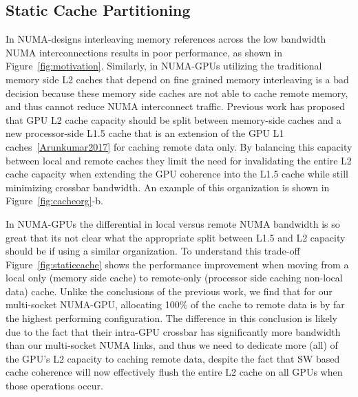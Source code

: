 \subsection{Static Cache Partitioning}
In NUMA-designs interleaving memory references across the low bandwidth NUMA
interconnections results in poor performance, as shown in Figure~\ref{fig:motivation}.
Similarly, in NUMA-GPUs utilizing the traditional memory side L2 caches that 
depend on fine grained memory interleaving is a bad decision because these memory
side caches are not able to cache remote memory, and thus cannot reduce NUMA
interconnect traffic.  Previous work has proposed that GPU L2 cache capacity
should be split between memory-side caches and a new processor-side L1.5 cache
that is an extension of the GPU L1 caches~\ref{Arunkumar2017} for caching remote
data only.  By balancing this capacity between local and remote caches they limit the 
need for invalidating the entire L2 cache capacity when extending the GPU coherence 
into the L1.5 cache while still minimizing crossbar bandwidth. An example of this 
organization is shown in Figure~\ref{fig:cacheorg}-b.

In NUMA-GPUs the differential in local versus remote NUMA bandwidth is so great
that its not clear what the appropriate split between L1.5 and L2 capacity should be
if using a similar organization.  To understand this trade-off Figure~\ref{fig:staticcache}
shows the performance improvement when moving from a local only (memory side cache)
to remote-only (processor side caching non-local data) cache.  Unlike the conclusions
of the previous work, we find that for our multi-socket NUMA-GPU, allocating
100\% of the cache to remote data is by far the highest performing configuration.
The difference in this conclusion is likely due to the fact that their intra-GPU
crossbar has significantly more bandwidth than our multi-socket NUMA links, and thus
we need to dedicate more (all) of the GPU's L2 capacity to caching remote data, despite
the fact that SW based cache coherence will now effectively flush the entire L2 cache
on all GPUs when those operations occur.

